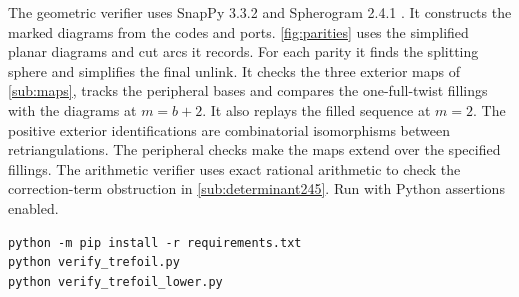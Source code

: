 \documentclass[a4paper,11pt]{amsart}
\numberwithin{equation}{subsection}
\theoremstyle{plain}
\theoremstyle{remark}
\begin{document}
The geometric verifier uses SnapPy 3.3.2 and Spherogram 2.4.1 \cite{SnapPy}. It constructs the marked diagrams from the codes and ports. \autoref{fig:parities} uses the simplified planar diagrams and cut arcs it records. For each parity it finds the splitting sphere and simplifies the final unlink. It checks the three exterior maps of \autoref{sub:maps}, tracks the peripheral bases and compares the one-full-twist fillings with the diagrams at $m=b+2$. It also replays the filled sequence at $m=2$. The positive exterior identifications are combinatorial isomorphisms between retriangulations. The peripheral checks make the maps extend over the specified fillings. The arithmetic verifier uses exact rational arithmetic to check the correction-term obstruction in \autoref{sub:determinant245}. Run with Python assertions enabled.
\begin{verbatim}
python -m pip install -r requirements.txt
python verify_trefoil.py
python verify_trefoil_lower.py
\end{verbatim}
\end{document}
